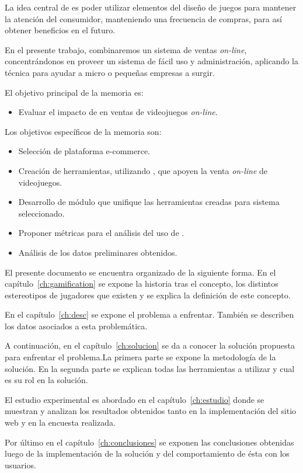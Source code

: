 La idea central de  {\gam} es poder utilizar elementos del diseño de juegos
para mantener la atención del consumidor, manteniendo una frecuencia de compras,
para así obtener beneficios en el futuro.

En el presente trabajo, combinaremos un sistema de ventas \emph{on-line}, concentrándonos
en proveer un sistema de fácil uso y administración, aplicando la técnica {\gam}
para ayudar a micro o pequeñas empresas a surgir.

El objetivo principal de la memoria es:

\begin{itemize}
    \item Evaluar el impacto de {\gam} en ventas de videojuegos \emph{on-line}.
\end{itemize}

Los objetivos específicos de la memoria son:
\begin{itemize}
    \item Selección de plataforma e-commerce.
    \item Creación de herramientas, utilizando {\gam}, que apoyen la
          venta \emph{on-line} de videojuegos.
    \item Desarrollo de módulo que unifique las herramientas creadas para sistema
          seleccionado.
    \item Proponer métricas para el análisis del uso de {\gam}.
    \item Análisis de los datos preliminares obtenidos.
\end{itemize}

El presente documento se encuentra organizado de la siguiente forma.
En el capítulo~\ref{ch:gamification} se expone la historia tras
el concepto, los distintos estereotipos de jugadores que existen y 
se explica la definición de este concepto.

En el capítulo~\ref{ch:desc} se expone el problema a enfrentar.
También se describen los datos asociados a esta problemática.

A continuación, en el capítulo~\ref{ch:solucion} se da a conocer la solución
propuesta para enfrentar el problema.La primera parte se expone la metodología
de la solución. En la segunda parte se explican todas las herramientas a utilizar
 y cual es su rol en la solución.

El estudio experimental es abordado en el capítulo~\ref{ch:estudio} donde
se muestran y analizan los resultados obtenidos tanto en la implementación
del sitio web y en la encuesta realizada.

Por último en el capítulo~\ref{ch:conclusiones} se exponen las conclusiones
obtenidas luego de la implementación de la solución y del comportamiento de ésta
con los usuarios.
